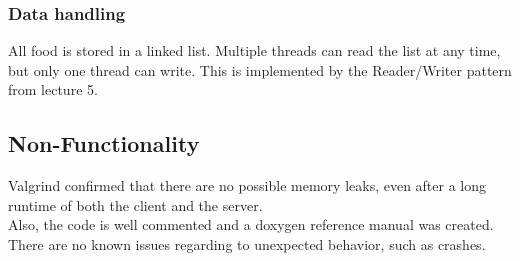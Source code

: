\documentclass[a4paper, 12pt]{scrartcl} %
\begin{document}
\subsubsection{Data handling}
All food is stored in a linked list. Multiple threads can read the list at any time, but only one thread can write. This is implemented by the Reader/Writer pattern from lecture 5.

\subsection{Non-Functionality}
Valgrind confirmed that there are no possible memory leaks, even
after a long runtime of both the client and the server.\\
Also, the code is well commented and a doxygen reference manual was created. \\
There are no known issues regarding to unexpected behavior, such as crashes.

%
%
\end{document}
